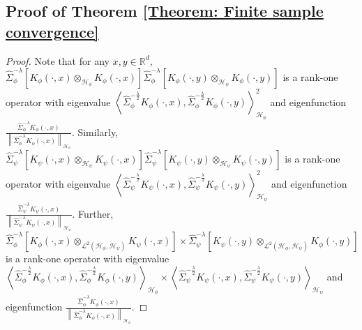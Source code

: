 \documentclass[11pt]{article}
\newcommand{\R}{\mathbb{R}}
\newcommand{\HS}{\mathcal{L}^{2}}
\newcommand{\repone}{\phi}
\newcommand{\reptwo}{\psi}
\newcommand{\Hone}{\mathcal{H}_{\phi}}
\newcommand{\Htwo}{\mathcal{H}_{\psi}}
\newcommand{\norm}[1]{\left\|#1\right\|}
\newcommand{\inprod}[1]{\left \langle #1 \right\rangle}
\theoremstyle{plain}
\begin{document}
\subsection{Proof of Theorem \ref{Theorem: Finite sample convergence}}\label{Proof of Theorem 2}

\begin{proof}
    Note that for any $x,y \in \R^{d}$, $\hat{\Sigma}_{\repone}^{-\lambda}\left[K_{\repone}(\cdot,x)\otimes_{\Hone}K_{\repone}(\cdot,x)\right]\hat{\Sigma}_{\repone}^{-\lambda}\left[K_{\repone}(\cdot,y)\otimes_{\Hone}K_{\repone}(\cdot,y)\right]$ is a rank-one operator with eigenvalue $\inprod{\hat{\Sigma}_{\repone}^{-\frac{\lambda}{2}}K_{\repone}(\cdot,x),\hat{\Sigma}_{\repone}^{-\frac{\lambda}{2}}K_{\repone}(\cdot,y)}_{\Hone}^{2}$ and eigenfunction $\frac{\hat{\Sigma}_{\repone}^{-\lambda}K_{\repone}(\cdot,x)}{\norm{\hat{\Sigma}_{\repone}^{-\lambda}K_{\repone}(\cdot,x)}_{\Hone}}$. Similarly, $\hat{\Sigma}_{\reptwo}^{-\lambda}\left[K_{\reptwo}(\cdot,x)\otimes_{\Htwo}K_{\reptwo}(\cdot,x)\right]\hat{\Sigma}_{\reptwo}^{-\lambda}\left[K_{\reptwo}(\cdot,y)\otimes_{\Htwo}K_{\reptwo}(\cdot,y)\right]$ is a rank-one operator with eigenvalue $\inprod{\hat{\Sigma}_{\reptwo}^{-\frac{\lambda}{2}}K_{\reptwo}(\cdot,x),\hat{\Sigma}_{\reptwo}^{-\frac{\lambda}{2}}K_{\reptwo}(\cdot,y)}_{\Htwo}^{2}$ and eigenfunction $\frac{\hat{\Sigma}_{\reptwo}^{-\lambda}K_{\reptwo}(\cdot,x)}{\norm{\hat{\Sigma}_{\reptwo}^{-\lambda}K_{\reptwo}(\cdot,x)}_{\Htwo}}$. Further, \\$\hat{\Sigma}_{\repone}^{-\lambda}\left[K_{\repone}(\cdot,x)\otimes_{\HS(\Hone,\Htwo)}K_{\reptwo}(\cdot,x)\right] \times\hat{\Sigma}_{\reptwo}^{-\lambda}\left[K_{\reptwo}(\cdot,y)\otimes_{\HS(\Hone,\Htwo)}K_{\repone}(\cdot,y)\right]$ is a rank-one operator with eigenvalue $\inprod{\hat{\Sigma}_{\repone}^{-\frac{\lambda}{2}}K_{\repone}(\cdot,x),\hat{\Sigma}_{\repone}^{-\frac{\lambda}{2}}K_{\repone}(\cdot,y)}_{\Hone}\times\inprod{\hat{\Sigma}_{\reptwo}^{-\frac{\lambda}{2}}K_{\reptwo}(\cdot,x),\hat{\Sigma}_{\reptwo}^{-\frac{\lambda}{2}}K_{\reptwo}(\cdot,y)}_{\Htwo}$ and eigenfunction $\frac{\hat{\Sigma}_{\repone}^{-\lambda}K_{\repone}(\cdot,x)}{\norm{\hat{\Sigma}_{\repone}^{-\lambda}K_{\repone}(\cdot,x)}_{\Hone}}$.


\end{proof}
\end{document}
